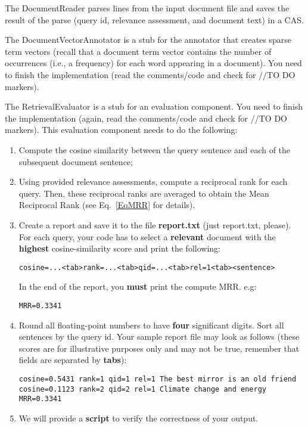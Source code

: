 \documentclass[oneside,11pt]{memoir}
\begin{document}
The DocumentReader parses lines from the input document file and saves the result of the parse (query id, relevance assessment, and document text) in a CAS.

The DocumentVectorAnnotator is a stub for the annotator that creates sparse term vectors
(recall that a document term vector contains the number of occurrences (i.e., a frequency)
for each word appearing in a document). 
You need to finish the implementation (read the comments/code and check for //TO DO markers).


The RetrievalEvaluator is a stub for an evaluation component. 
You need to finish the implementation
(again, read the comments/code and check for //TO DO markers).
This evaluation component needs to do the following:
\begin{enumerate}
\item Compute the cosine similarity between the query sentence and each of the subsequent
document sentence; 
\item Using provided relevance assessments, compute a reciprocal rank for each query.
Then, these reciprocal ranks are averaged to obtain the Mean Reciprocal Rank (see Eq.~\ref{EqMRR} for details).
\item Create a report and save it to the file \textbf{report.txt} (just report.txt, please). 
For each query, your code has to select a \textbf{relevant} document with the
\textbf{highest} cosine-similarity score and print the following:
\begin{verbatim}
cosine=...<tab>rank=...<tab>qid=...<tab>rel=1<tab><sentence>
\end{verbatim}
In the end of the report, you \textbf{must} print the compute MRR. e.g:
\begin{verbatim}
MRR=0.3341
\end{verbatim}
\item Round all floating-point numbers to have \textbf{four} significant digits.
Sort all sentences by the query id.
Your sample report file may look as follows (these scores are for illustrative purposes only 
and may not be true, remember that fields are separated by \textbf{tabs}):
\begin{verbatim}
cosine=0.5431 rank=1 qid=1 rel=1 The best mirror is an old friend
cosine=0.1123 rank=2 qid=2 rel=1 Climate change and energy
MRR=0.3341
\end{verbatim}
\item We will provide a \textbf{script} to verify the correctness of your output.
\end{enumerate}
\end{document}
